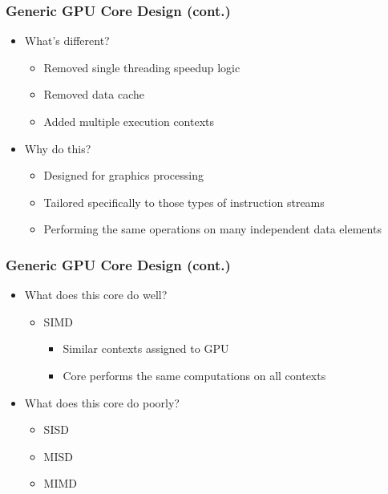 \documentclass{beamer}
\begin{document}
\begin{frame}
	\frametitle{Generic GPU Core Design (cont.)}
	\begin{itemize}
		\item<1-> What's different?
		\begin{itemize}
			\item<2-> Removed single threading speedup logic
			\item<2-> Removed data cache
			\item<2-> Added multiple execution contexts
		\end{itemize}
		\item<3-> Why do this?
		\begin{itemize}
			\item<4-> Designed for graphics processing
			\item<4-> Tailored specifically to those types of instruction streams
			\item<4-> Performing the same operations on many independent data elements
		\end{itemize}
	\end{itemize}
\end{frame}

\begin{frame}
	\frametitle{Generic GPU Core Design (cont.)}
	\begin{itemize}
		\item<1-> What does this core do well?
		\begin{itemize}
			\item<2-> SIMD
			\begin{itemize}
				\item<2-> Similar contexts assigned to GPU
				\item<2-> Core performs the same computations on all contexts
			\end{itemize}
		\end{itemize}
		\item<3-> What does this core do poorly?
		\begin{itemize}
			\item<4-> SISD
			\item<4-> MISD
			\item<4-> MIMD
		\end{itemize}
	\end{itemize}
\end{frame}
\end{document}
